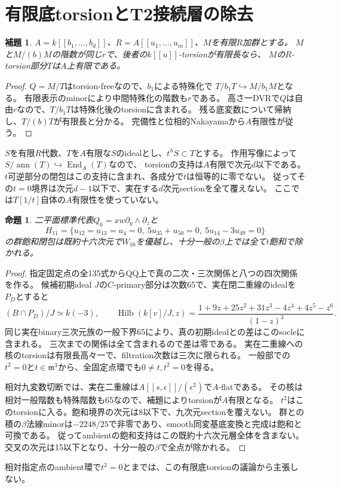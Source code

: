 \documentclass[11pt,a4paper]{ltjsarticle}
\newtheorem{proposition}[theorem]{命題}
\newtheorem{lemma}[theorem]{補題}
\theoremstyle{remark}
\begin{document}
\section{有限底torsionとT2接続層の除去}
\begin{lemma}
$A=k[[b_1,\ldots,b_d]]$、$R=A[[u_1,\ldots,u_m]]$、$M$を有限$R$加群とする。
$M$と$M/(b)M$の階数が同じ$r$で、後者の$k[[u]]$-torsionが有限長なら、
$M$の$R$-torsion部分$T$は$A$上有限である。
\end{lemma}
\begin{proof}
$Q=M/T$はtorsion-freeなので、$b_1$による特殊化で
$T/b_1T\hookrightarrow M/b_1M$となる。
有限表示のminorにより中間特殊化の階数も$r$である。
高さ一DVRで$Q$は自由$r$なので、$T/b_1T$は特殊化後のtorsionに含まれる。
残る底変数について帰納し、$T/(b)T$が有限長と分かる。
完備性と位相的Nakayamaから$A$有限性が従う\cite{finite-base-v42}。
\end{proof}

$S$を有限$R$代数、$T$を$A$有限な$S$のidealとし、$t^hS\subset T$とする。
作用写像によって$S/\operatorname{ann}(T)\hookrightarrow\operatorname{End}_A(T)$なので、
torsionの支持は$A$有限で次元$d$以下である。
$t$可逆部分の閉包はこの支持に含まれ、各成分で$t$は恒等的に零でない。
従ってその$t=0$境界は次元$d-1$以下で、実在する$d$次元sectionを全て覆えない。
ここでは$T[1/t]$自体の$A$有限性を使っていない。

\begin{proposition}
二平面標準代表$Q_0=xw\partial_y\wedge\partial_z$と
\[
 H_{11}=\{u_{12}=u_{13}=u_4=0,\ 5u_{35}+u_{50}=0,\ 5u_{14}-3u_{49}=0\}
\]
の群飽和閉包は既約十六次元で$W_{16}$を優越し、十分一般の$\beta$上では全て$t$飽和で除かれる。
\end{proposition}
\begin{proof}
指定固定点の全135式からQQ上で真の二次・三次関係と八つの四次関係を作る。
候補初期ideal $J$の$C$-primary部分は次数65で、実在閉二重線のidealを$P_D$とすると
\[
 (B\cap P_D)/J\simeq k(-3),\qquad
 \operatorname{Hilb}(k[v]/J,z)=
 \frac{1+9z+25z^2+31z^3-4z^4+4z^5-z^6}{(1-z)^3}.
\]
同じ実在binary三次元族の一般下界65により、真の初期idealとの差はこのsocleに含まれる。
三次までの関係は全て含まれるので差は零である。
実在二重線への核のtorsionは有限長高々一で、filtration次数は三次に限られる。
一般部での$t^2=0$と$t\in\mathfrak m^3$から、全固定点環でも$0\ne t,t^2=0$を得る。

相対九変数切断では、実在二重線は$A[[s,\epsilon]]/(\epsilon^2)$で$A$-flatである。
その核は相対一般階数も特殊階数も65なので、補題によりtorsionが$A$有限となる。
$t^2$はこのtorsionに入る。飽和境界の次元は8以下で、九次元sectionを覆えない。
群との積の$\beta$法線minorは$-2248/25$で非零であり、smooth同変基底変換と完成は飽和と可換である。
従ってambientの飽和支持はこの既約十六次元層全体を含まない。
交叉の次元は15以下となり、十分一般の$\beta$で全点が除かれる\cite{t2-v42}。
\end{proof}
相対指定点のambient環で$t^2=0$とまでは、この有限底torsionの議論から主張しない。
\end{document}
